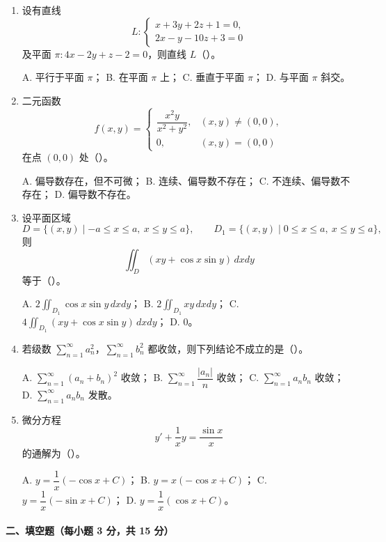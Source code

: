 \begin{enumerate}
  \item 设有直线
  \[
    L:\begin{cases}
      x+3y+2z+1=0,\\
      2x-y-10z+3=0
    \end{cases}
  \]
  及平面 $\pi:4x-2y+z-2=0$，则直线 $L$（\quad）。

  A. 平行于平面 $\pi$；\quad
  B. 在平面 $\pi$ 上；\quad
  C. 垂直于平面 $\pi$；\quad
  D. 与平面 $\pi$ 斜交。

  \item 二元函数
  \[
    f(x,y)=
    \begin{cases}
      \dfrac{x^2y}{x^2+y^2}, & (x,y)\ne(0,0),\\
      0, & (x,y)=(0,0)
    \end{cases}
  \]
  在点 $(0,0)$ 处（\quad）。

  A. 偏导数存在，但不可微；\quad
  B. 连续、偏导数不存在；\quad
  C. 不连续、偏导数不存在；\quad
  D. 偏导数不存在。

  \item 设平面区域
  \[
    D=\{(x,y)\mid -a\le x\le a,\ x\le y\le a\},\qquad
    D_1=\{(x,y)\mid 0\le x\le a,\ x\le y\le a\},
  \]
  则
  \[
    \iint_D (xy+\cos x\sin y)\,dxdy
  \]
  等于（\quad）。

  A. $2\iint_{D_1}\cos x\sin y\,dxdy$；\quad
  B. $2\iint_{D_1}xy\,dxdy$；\quad
  C. $4\iint_{D_1}(xy+\cos x\sin y)\,dxdy$；\quad
  D. $0$。

  \item 若级数 $\sum_{n=1}^{\infty}a_n^2$，$\sum_{n=1}^{\infty}b_n^2$ 都收敛，则下列结论不成立的是（\quad）。

  A. $\sum_{n=1}^{\infty}(a_n+b_n)^2$ 收敛；\quad
  B. $\sum_{n=1}^{\infty}\dfrac{|a_n|}{n}$ 收敛；\quad
  C. $\sum_{n=1}^{\infty}a_nb_n$ 收敛；\quad
  D. $\sum_{n=1}^{\infty}a_nb_n$ 发散。

  \item 微分方程
  \[
    y'+\frac{1}{x}y=\frac{\sin x}{x}
  \]
  的通解为（\quad）。

  A. $y=\dfrac{1}{x}(-\cos x+C)$；\quad
  B. $y=x(-\cos x+C)$；\quad
  C. $y=\dfrac{1}{x}(-\sin x+C)$；\quad
  D. $y=\dfrac{1}{x}(\cos x+C)$。
\end{enumerate}

\paragraph{二、填空题（每小题 3 分，共 15 分）}

